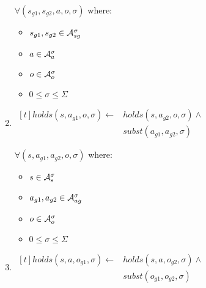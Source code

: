 \documentclass[10pt, twocolumn]{article}
\begin{document}
\begin{enumerate}
                $\forall (s_{g1}, s_{g2}, a, o, \sigma)$ where:

                \begin{itemize}
                  \item
                    $s_{g1}, s_{g2} \in {\cal A}^{\sigma}_{sg}$
                  \item
                    $a \in {\cal A}^{\sigma}_{a}$
                  \item
                    $o \in {\cal A}^{\sigma}_{o}$
                  \item
                    $0 \leq \sigma \leq \Sigma$
                \end{itemize}
              \item
                \begin{math}
                  \begin{aligned}[t]
                    holds(s, a_{g1}, o, \sigma) \leftarrow &
                    holds(s, a_{g2}, o, \sigma) \land \\
                    & subst(a_{g1}, a_{g2}, \sigma)
                  \end{aligned}
                \end{math}

                $\forall (s, a_{g1}, a_{g2}, o, \sigma)$ where:

                \begin{itemize}
                  \item
                    $s \in {\cal A}^{\sigma}_{s}$
                  \item
                    $a_{g1}, a_{g2} \in {\cal A}^{\sigma}_{ag}$
                  \item
                    $o \in {\cal A}^{\sigma}_{o}$
                  \item
                    $0 \leq \sigma \leq \Sigma$
                \end{itemize}
                \item
                \begin{math}
                  \begin{aligned}[t]
                    holds(s, a, o_{g1}, \sigma) \leftarrow &
                    holds(s, a, o_{g2}, \sigma) \land \\
                    & subst(o_{g1}, o_{g2}, \sigma)
                  \end{aligned}
                \end{math}


\end{enumerate}
\end{document}
